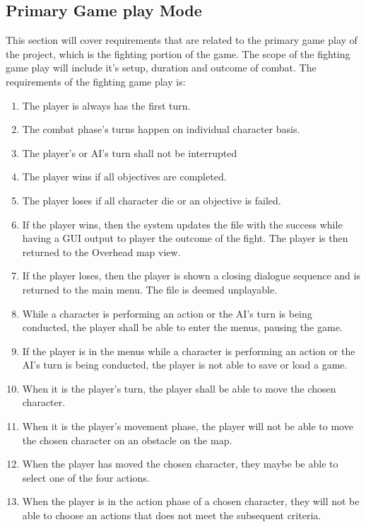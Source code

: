 \documentclass{article}
\begin{document}
\subsection{Primary Game play Mode}
\quad This section will cover requirements that are related to the primary game play of the project, which is the fighting portion of the game. The scope of the fighting game play will include it's setup, duration and outcome of combat. The requirements of the fighting game play is:
\begin{enumerate}[{PGR}1. ]
	\item The player is always has the first turn.
	\item The combat phase's turns happen on individual character basis.
	\item The player's or AI's turn shall not be interrupted
	\item The player wins if all objectives are completed.
	\item The player loses if all character die or an objective is failed.
	\item If the player wins, then the system updates the file with the success while having a GUI output to player the outcome of the fight. The player is then returned to the Overhead map view.
	\item If the player loses, then the player is shown a closing dialogue sequence and is returned to the main menu. The file is deemed unplayable.
	\item While a character is performing an action or the AI's turn is being conducted, the player shall be able to enter the menus, pausing the game.
	\item If the player is in the menus while a character is performing an action or the AI's turn is being conducted, the player is not able to save or load a game.
	\item When it is the player's turn, the player shall be able to move the chosen character.
	\item When it is the player's movement phase, the player will not be able to move the chosen character on an obstacle on the map.
	\item When the player has moved the chosen character, they maybe be able to select one of the four actions.
	\item When the player is in the action phase of a chosen character, they will not be able to choose an actions that does not meet the subsequent criteria.

\end{enumerate}
\end{document}
